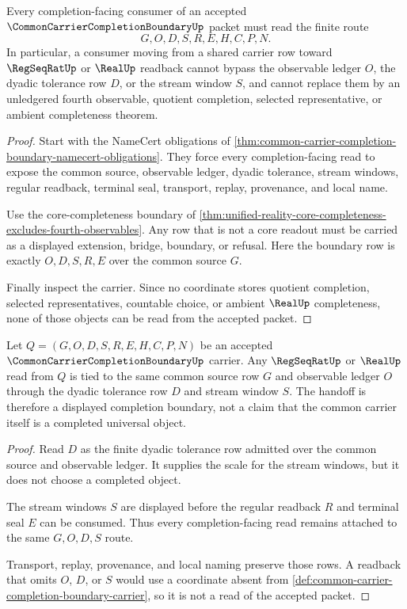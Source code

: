 \begin{theorem}
\label{thm:common-carrier-completion-boundary-nonescape}
Every completion-facing consumer of an accepted $\CommonCarrierCompletionBoundaryUp$ packet must read the finite route
$$
G,O,D,S,R,E,H,C,P,N .
$$
In particular, a consumer moving from a shared carrier row toward $\RegSeqRatUp$ or $\RealUp$ readback cannot bypass the observable ledger $O$, the dyadic tolerance row $D$, or the stream window $S$, and cannot replace them by an unledgered fourth observable, quotient completion, selected representative, or ambient completeness theorem.
\end{theorem}
\begin{proof}
Start with the NameCert obligations of \autoref{thm:common-carrier-completion-boundary-namecert-obligations}. They force every completion-facing read to expose the common source, observable ledger, dyadic tolerance, stream windows, regular readback, terminal seal, transport, replay, provenance, and local name.

Use the core-completeness boundary of \autoref{thm:unified-reality-core-completeness-excludes-fourth-observables}. Any row that is not a core readout must be carried as a displayed extension, bridge, boundary, or refusal. Here the boundary row is exactly $O,D,S,R,E$ over the common source $G$.

Finally inspect the carrier. Since no coordinate stores quotient completion, selected representatives, countable choice, or ambient $\RealUp$ completeness, none of those objects can be read from the accepted packet.
\end{proof}

\begin{theorem}
\label{thm:common-carrier-completion-boundary-regular-readback}
Let $Q=(G,O,D,S,R,E,H,C,P,N)$ be an accepted $\CommonCarrierCompletionBoundaryUp$ carrier. Any $\RegSeqRatUp$ or $\RealUp$ read from $Q$ is tied to the same common source row $G$ and observable ledger $O$ through the dyadic tolerance row $D$ and stream window $S$. The handoff is therefore a displayed completion boundary, not a claim that the common carrier itself is a completed universal object.
\end{theorem}
\begin{proof}
Read $D$ as the finite dyadic tolerance row admitted over the common source and observable ledger. It supplies the scale for the stream windows, but it does not choose a completed object.

The stream windows $S$ are displayed before the regular readback $R$ and terminal seal $E$ can be consumed. Thus every completion-facing read remains attached to the same $G,O,D,S$ route.

Transport, replay, provenance, and local naming preserve those rows. A readback that omits $O$, $D$, or $S$ would use a coordinate absent from \autoref{def:common-carrier-completion-boundary-carrier}, so it is not a read of the accepted packet.
\end{proof}

